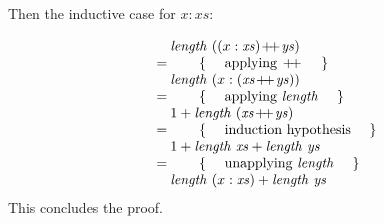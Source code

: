 \begin{parts}
\begin{solution}
		Then the inductive case for $x:\mathit{xs}$:
		
		\begin{displaymath}
		\begin{array}{cl}
		\expr{\mathit{length}~((x:\mathit{xs}) \append \mathit{ys})}
		\hint{applying $\append$}
		\expr{\mathit{length}~(x : (\mathit{xs} \append \mathit{ys}))}
		\hint{applying $\mathit{length}$}
		\expr{1 + \mathit{length}~(\mathit{xs} \append \mathit{ys})}
		\hint{induction hypothesis}
		\expr{1 + \mathit{length}~\mathit{xs} + \mathit{length}~\mathit{ys}}
		\hint{unapplying $\mathit{length}$}
		\lastexpr{\mathit{length}~(x:\mathit{xs}) + \mathit{length}~\mathit{ys}}
		\end{array}
		\end{displaymath}
		This concludes the proof.
	\end{solution}
	
\end{parts}
